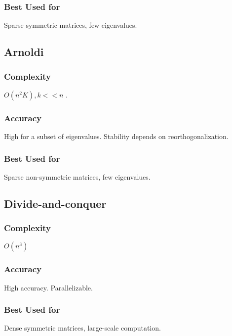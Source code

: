 \documentclass[a4paper,12pt]{article}
\begin{document}
\subsubsection{Best Used for}
Sparse symmetric matrices, few eigenvalues.
\subsection{Arnoldi}
\subsubsection{Complexity}
$O(n^2K),k<<n$ .
\subsubsection{Accuracy}
High for a subset of eigenvalues. Stability depends on reorthogonalization.
\subsubsection{Best Used for }
Sparse non-symmetric matrices, few eigenvalues.
\subsection{Divide-and-conquer}
\subsubsection{Complexity}
$O(n^3)$
\subsubsection{Accuracy}
High accuracy. Parallelizable.
\subsubsection{Best Used for}
Dense symmetric matrices, large-scale computation.

 
 
 
 
 



 
\end{document}

